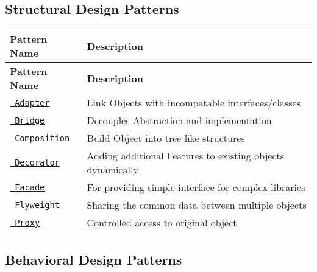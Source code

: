 \subsection*{Structural Design Patterns}

\tabulinesep=1mm
\begin{longtabu}spread 0pt [c]{*{2}{|X[-1]}|}
\hline
\cellcolor{\tableheadbgcolor}\textbf{ Pattern Name  }&\cellcolor{\tableheadbgcolor}\textbf{ Description   }\\
\endfirsthead
\hline
\endfoot
\hline
\cellcolor{\tableheadbgcolor}\textbf{ Pattern Name  }&\cellcolor{\tableheadbgcolor}\textbf{ Description   }\\
\endhead
\href{https://github.com/jayavardhanravi/DesignPatterns/tree/master/Adapter}{\texttt{ Adapter}}  &Link Objects with incompatable interfaces/classes   \\
\href{https://github.com/jayavardhanravi/DesignPatterns/tree/master/Bridge}{\texttt{ Bridge}}  &Decouples Abstraction and implementation   \\
\href{https://github.com/jayavardhanravi/DesignPatterns/tree/master/Composition}{\texttt{ Composition}}  &Build Object into tree like structures   \\
\href{https://github.com/jayavardhanravi/DesignPatterns/tree/master/Decorator}{\texttt{ Decorator}}  &Adding additional Features to existing objects dynamically   \\
\href{https://github.com/jayavardhanravi/DesignPatterns/tree/master/Facade}{\texttt{ Facade}}  &For providing simple interface for complex libraries   \\
\href{https://github.com/jayavardhanravi/DesignPatterns/tree/master/Flyweight}{\texttt{ Flyweight}}  &Sharing the common data between multiple objects   \\
\href{https://github.com/jayavardhanravi/DesignPatterns/tree/master/Proxy}{\texttt{ Proxy}}  &Controlled access to original object   \\
\end{longtabu}


\subsection*{Behavioral Design Patterns}

